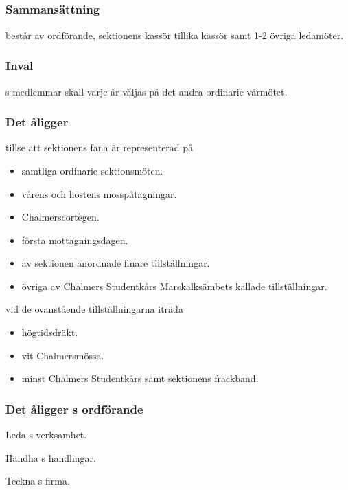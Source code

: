 \subsection{\FANBARERITFULL}
\subsubsection{Sammansättning}
\FANBARERIT{} består av ordförande, sektionens kassör tillika kassör samt 1-2 övriga ledamöter.

\subsubsection{Inval}
\FANBARERIT{}s medlemmar skall varje år väljas på det andra ordinarie vårmötet.

\subsubsection{Det åligger \FANBARERIT}
\label{sec:fanbarerit:function}
\begin{att}
	\item tillse att sektionens fana är representerad på
	\begin{itemize}
		\item samtliga ordinarie sektionsmöten.
		\item vårens och höstens mösspåtagningar.
		\item Chalmerscortègen.
		\item första mottagningsdagen.
		\item av sektionen anordnade finare tillställningar.
		\item övriga av Chalmers Studentkårs Marskalksämbets kallade tillställningar.
	\end{itemize}
	\item vid de ovanstående tillställningarna iträda
	\begin{itemize}
		\item högtidsdräkt.
		\item vit Chalmersmössa.
		\item minst Chalmers Studentkårs samt sektionens frackband.
	\end{itemize}
\end{att}

\subsubsection{Det åligger \FANBARERIT{}s ordförande}
\begin{att}
	\item Leda \FANBARERIT{}s verksamhet.
	\item Handha \FANBARERIT{}s handlingar.
	\item Teckna \FANBARERIT{}s firma.
\end{att}

